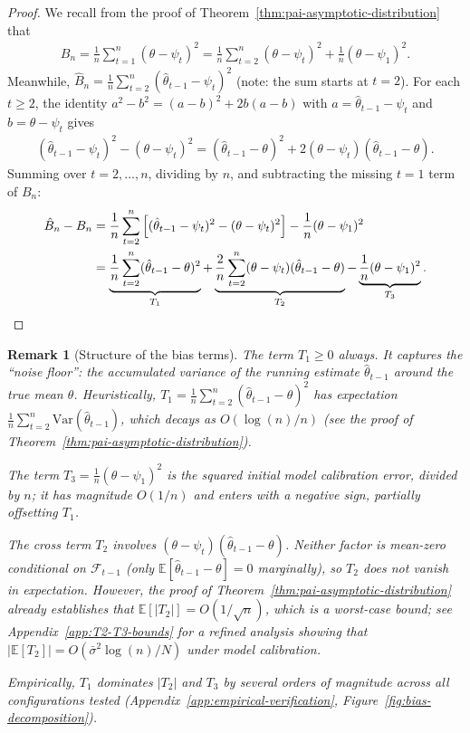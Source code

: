 \documentclass[11pt]{article}
\newtheorem{remark}[theorem]{Remark}
\newcommand{\thetahat}{\hat{\theta}}
\newcommand{\Bhat}{\hat{B}}
\newcommand{\F}{\mathcal{F}}
\newcommand{\Var}{\mathrm{Var}}
\begin{document}
\begin{proof}
We recall from the proof of Theorem~\ref{thm:pai-asymptotic-distribution} that
\begin{align}
\label{eq:Bn-expanded}
    B_n = \frac{1}{n}\sum_{t=1}^n \left( \theta - \psi_t \right)^2 = \frac{1}{n}\sum_{t=2}^n \left( \theta - \psi_t \right)^2 + \frac{1}{n}\left( \theta - \psi_1 \right)^2.
\end{align}
Meanwhile, $\Bhat_n = \frac{1}{n}\sum_{t=2}^n (\thetahat_{t-1} - \psi_t)^2$ (note: the sum starts at $t=2$). For each $t \geq 2$, the identity $a^2 - b^2 = (a - b)^2 + 2b(a-b)$ with $a = \thetahat_{t-1} - \psi_t$ and $b = \theta - \psi_t$ gives
\begin{align*}
    (\thetahat_{t-1} - \psi_t)^2 - (\theta - \psi_t)^2 = (\thetahat_{t-1} - \theta)^2 + 2(\theta - \psi_t)(\thetahat_{t-1} - \theta).
\end{align*}
Summing over $t = 2, \ldots, n$, dividing by $n$, and subtracting the missing $t=1$ term of $B_n$:
\begin{align*}
    \Bhat_n - B_n &= \frac{1}{n}\sum_{t=2}^n\left[(\thetahat_{t-1} - \psi_t)^2 - (\theta - \psi_t)^2\right] - \frac{1}{n}(\theta - \psi_1)^2 \\
    &= \underbrace{\frac{1}{n}\sum_{t=2}^n (\thetahat_{t-1} - \theta)^2}_{T_1} + \underbrace{\frac{2}{n}\sum_{t=2}^n (\theta - \psi_t)(\thetahat_{t-1} - \theta)}_{T_2} - \underbrace{\frac{1}{n}(\theta - \psi_1)^2}_{T_3}. \qedhere
\end{align*}
\end{proof}

\begin{remark}[Structure of the bias terms]
\label{rmk:T1-dominance}
The term $T_1 \geq 0$ always. It captures the ``noise floor'': the accumulated variance of the running estimate $\thetahat_{t-1}$ around the true mean $\theta$. Heuristically, $T_1 = \frac{1}{n}\sum_{t=2}^n (\thetahat_{t-1} - \theta)^2$ has expectation $\frac{1}{n}\sum_{t=2}^n \Var(\thetahat_{t-1})$, which decays as $O(\log(n)/n)$ (see the proof of Theorem~\ref{thm:pai-asymptotic-distribution}).

The term $T_3 = \frac{1}{n}(\theta - \psi_1)^2$ is the squared initial model calibration error, divided by $n$; it has magnitude $O(1/n)$ and enters with a negative sign, partially offsetting $T_1$.

The cross term $T_2$ involves $(\theta - \psi_t)(\thetahat_{t-1} - \theta)$. Neither factor is mean-zero conditional on $\F_{t-1}$ (only $\mathbb{E}[\thetahat_{t-1} - \theta] = 0$ marginally), so $T_2$ does not vanish in expectation. However, the proof of Theorem~\ref{thm:pai-asymptotic-distribution} already establishes that $\mathbb{E}[|T_2|] = O(1/\sqrt{n})$, which is a worst-case bound; see Appendix~\ref{app:T2-T3-bounds} for a refined analysis showing that $|\mathbb{E}[T_2]| = O(\bar{\sigma}^2 \log(n) / N)$ under model calibration.

Empirically, $T_1$ dominates $|T_2|$ and $T_3$ by several orders of magnitude across all configurations tested (Appendix~\ref{app:empirical-verification}, Figure~\ref{fig:bias-decomposition}).
\end{remark}
\end{document}
